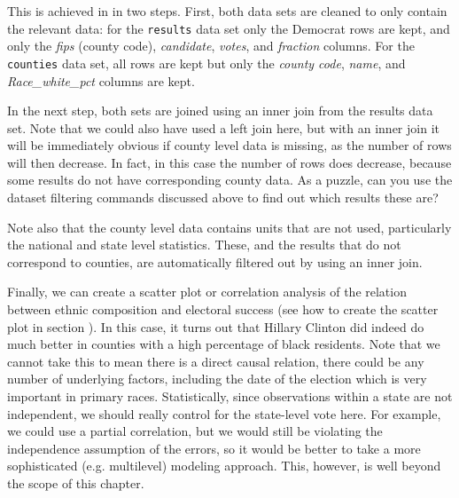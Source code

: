 This is achieved in  in two steps.
First, both data sets are cleaned to only contain the relevant data:
for the \texttt{results} data set only the Democrat rows are kept, and only the \emph{fips} (county code), \emph{candidate}, \emph{votes}, and \emph{fraction} columns.
For the \texttt{counties} data set, all rows are kept but only the \emph{county code}, \emph{name}, and \emph{Race\_white\_pct} columns are kept.


In the next step, both sets are joined using an inner join from the results data set.
Note that we could also have used a left join here, but with an inner join it will be immediately
obvious if county level data is missing, as the number of rows will then decrease.
In fact, in this case the number of rows does decrease, because some results do not have corresponding county data.
As a puzzle, can you use the dataset filtering commands discussed above to find out which results these are?

Note also that the county level data contains units that are not used, particularly the national and state level statistics.
These, and the results that do not correspond to counties, are automatically filtered out by using an inner join.

Finally, we can create a scatter plot or correlation analysis of the relation between ethnic composition and electoral success (see how to create the scatter plot in section ).
In this case, it turns out that Hillary Clinton did indeed do much better in counties with a high percentage of black residents.
Note that we cannot take this to mean there is a direct causal relation, there could be any number of underlying factors, including the date of the election which is very important in primary races.
Statistically, since observations within a state are not independent, we should really control for the state-level vote here.
For example, we could use a partial correlation, but we would still be violating the independence assumption of the errors,
so it would be better to take a more sophisticated (e.g. multilevel) modeling approach. This, however, is well beyond the scope
of this chapter. 

